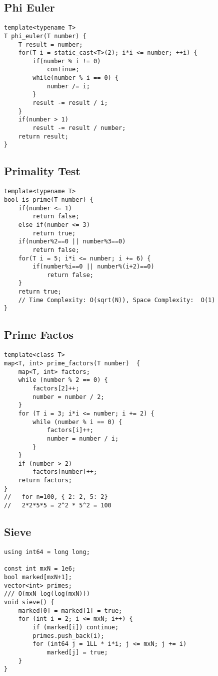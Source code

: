 \documentclass[10pt,letterpaper,twocolumn,twosided]{article}
\begin{document}
\subsection{Phi Euler}
\begin{lstlisting}
template<typename T>
T phi_euler(T number) {
    T result = number;
    for(T i = static_cast<T>(2); i*i <= number; ++i) {
        if(number % i != 0)
            continue;
        while(number % i == 0) {
            number /= i;
        }
        result -= result / i;
    }
    if(number > 1)
        result -= result / number;
    return result;
}
\end{lstlisting}

\subsection{Primality Test}
\begin{lstlisting}
template<typename T>
bool is_prime(T number) {
    if(number <= 1)
        return false;
    else if(number <= 3)
        return true;
    if(number%2==0 || number%3==0)
        return false;
    for(T i = 5; i*i <= number; i += 6) {
        if(number%i==0 || number%(i+2)==0)
            return false;
    }
    return true;
    // Time Complexity: O(sqrt(N)), Space Complexity:  O(1)
}
\end{lstlisting}

\subsection{Prime Factos}
\begin{lstlisting}
template<class T>
map<T, int> prime_factors(T number)  {
    map<T, int> factors;
    while (number % 2 == 0) {
        factors[2]++;
        number = number / 2;
    }
    for (T i = 3; i*i <= number; i += 2) {
        while (number % i == 0) {
            factors[i]++;
            number = number / i; 
        }
    }
    if (number > 2)
        factors[number]++;
    return factors;
}
//   for n=100, { 2: 2, 5: 2}
//   2*2*5*5 = 2^2 * 5^2 = 100
\end{lstlisting}

\subsection{Sieve}
\begin{lstlisting}
using int64 = long long;

const int mxN = 1e6;
bool marked[mxN+1];
vector<int> primes;
/// O(mxN log(log(mxN)))
void sieve() {
    marked[0] = marked[1] = true;
    for (int i = 2; i <= mxN; i++) {
        if (marked[i]) continue;
        primes.push_back(i);
        for (int64 j = 1LL * i*i; j <= mxN; j += i)
            marked[j] = true;
    }
}
\end{lstlisting}
\end{document}
